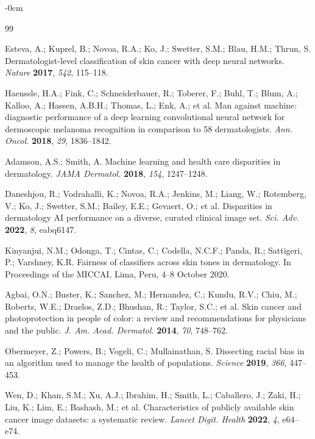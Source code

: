 \documentclass[ai,article,submit,pdftex,moreauthors]{Definitions/mdpi}
\begin{document}
\begin{adjustwidth}{-\extralength}{0cm}


\begin{thebibliography}{99}

Esteva, A.; Kuprel, B.; Novoa, R.A.; Ko, J.; Swetter, S.M.; Blau, H.M.; Thrun, S. Dermatologist-level classification of skin cancer with deep neural networks. \textit{Nature} \textbf{2017}, \textit{542}, 115--118.

Haenssle, H.A.; Fink, C.; Schneiderbauer, R.; Toberer, F.; Buhl, T.; Blum, A.; Kalloo, A.; Hassen, A.B.H.; Thomas, L.; Enk, A.; et al. Man against machine: diagnostic performance of a deep learning convolutional neural network for dermoscopic melanoma recognition in comparison to 58 dermatologists. \textit{Ann. Oncol.} \textbf{2018}, \textit{29}, 1836--1842.

Adamson, A.S.; Smith, A. Machine learning and health care disparities in dermatology. \textit{JAMA Dermatol.} \textbf{2018}, \textit{154}, 1247--1248.

Daneshjou, R.; Vodrahalli, K.; Novoa, R.A.; Jenkins, M.; Liang, W.; Rotemberg, V.; Ko, J.; Swetter, S.M.; Bailey, E.E.; Gevaert, O.; et al. Disparities in dermatology AI performance on a diverse, curated clinical image set. \textit{Sci. Adv.} \textbf{2022}, \textit{8}, eabq6147.

Kinyanjui, N.M.; Odonga, T.; Cintas, C.; Codella, N.C.F.; Panda, R.; Sattigeri, P.; Varshney, K.R. Fairness of classifiers across skin tones in dermatology. In Proceedings of the MICCAI, Lima, Peru, 4--8 October 2020.

Agbai, O.N.; Buster, K.; Sanchez, M.; Hernandez, C.; Kundu, R.V.; Chiu, M.; Roberts, W.E.; Draelos, Z.D.; Bhushan, R.; Taylor, S.C.; et al. Skin cancer and photoprotection in people of color: a review and recommendations for physicians and the public. \textit{J. Am. Acad. Dermatol.} \textbf{2014}, \textit{70}, 748--762.

Obermeyer, Z.; Powers, B.; Vogeli, C.; Mullainathan, S. Dissecting racial bias in an algorithm used to manage the health of populations. \textit{Science} \textbf{2019}, \textit{366}, 447--453.

Wen, D.; Khan, S.M.; Xu, A.J.; Ibrahim, H.; Smith, L.; Caballero, J.; Zaki, H.; Liu, K.; Lim, E.; Bashash, M.; et al. Characteristics of publicly available skin cancer image datasets: a systematic review. \textit{Lancet Digit. Health} \textbf{2022}, \textit{4}, e64--e74.


\end{thebibliography}
\end{adjustwidth}
\end{document}
